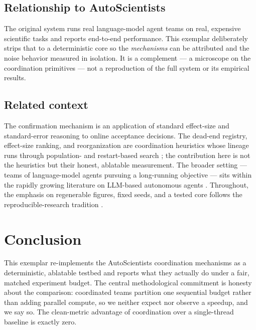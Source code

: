 \documentclass[
]{article}
\begin{document}
\subsection{Relationship to
AutoScientists}\label{relationship-to-autoscientists}

The original system \citep{gao2026autoscientists} runs real
language-model agent teams on real, expensive scientific tasks and
reports end-to-end performance. This exemplar deliberately strips that
to a deterministic core so the \emph{mechanisms} can be attributed and
the noise behavior measured in isolation. It is a complement --- a
microscope on the coordination primitives --- not a reproduction of the
full system or its empirical results.

\subsection{Related context}\label{related-context}

The confirmation mechanism is an application of standard effect-size and
standard-error reasoning \citep{cohen1988statistical} to online
acceptance decisions. The dead-end registry, effect-size ranking, and
reorganization are coordination heuristics whose lineage runs through
population- and restart-based search \citep{whitley2001overview}; the
contribution here is not the heuristics but their honest, ablatable
measurement. The broader setting --- teams of language-model agents
pursuing a long-running objective --- sits within the rapidly growing
literature on LLM-based autonomous agents \citep{wang2023survey}.
Throughout, the emphasis on regenerable figures, fixed seeds, and a
tested core follows the reproducible-research tradition
\citep{peng2011reproducible}.

\newpage

\section{Conclusion}\label{sec:conclusion}

This exemplar re-implements the AutoScientists coordination mechanisms
\citep{gao2026autoscientists} as a deterministic, ablatable testbed and
reports what they actually do under a fair, matched experiment budget.
The central methodological commitment is honesty about the comparison:
coordinated teams partition one sequential budget rather than adding
parallel compute, so we neither expect nor observe a speedup, and we say
so. The clean-metric advantage of coordination over a single-thread
baseline is exactly zero.
\end{document}
